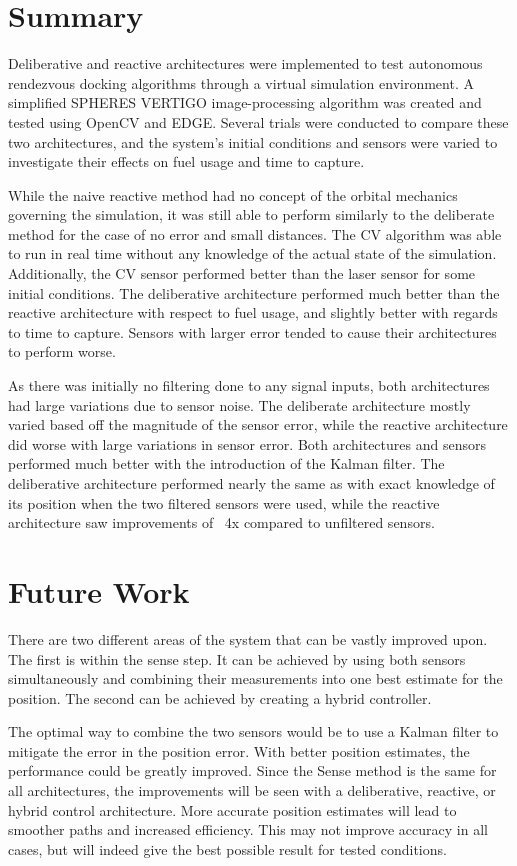 \documentclass[journal, 10pt]{IEEEtran}
\begin{document}
\section{Summary}
Deliberative and reactive architectures were implemented to test autonomous rendezvous docking algorithms through a virtual simulation environment. A simplified SPHERES VERTIGO image-processing algorithm was created and tested using OpenCV and EDGE. Several trials were conducted to compare these two architectures, and the system's initial conditions and sensors were varied to investigate their effects on fuel usage and time to capture.

While the naive reactive method had no concept of the orbital mechanics governing the simulation, it was still able to perform similarly to the deliberate method for the case of no error and small distances. The CV algorithm was able to run in real time without any knowledge of the actual state of the simulation. Additionally, the CV sensor performed better than the laser sensor for some initial conditions. The deliberative architecture performed much better than the reactive architecture with respect to fuel usage, and slightly better with regards to time to capture. Sensors with larger error tended to cause their architectures to perform worse. 

As there was initially no filtering done to any signal inputs, both architectures had large variations due to sensor noise. The deliberate architecture mostly varied based off the magnitude of the sensor error, while the reactive architecture did worse with large variations in sensor error. Both architectures and sensors performed much better with the introduction of the Kalman filter. The deliberative architecture performed nearly the same as with exact knowledge of its position when the two filtered sensors were used, while the reactive architecture saw improvements of ~4x compared to unfiltered sensors.


\section{Future Work}
There are two different areas of the system that can be vastly improved upon.  The first is within the sense step.  It can be achieved by using both sensors simultaneously and combining their measurements into one best estimate for the position.  The second can be achieved by creating a hybrid controller.

The optimal way to combine the two sensors would be to use a Kalman filter to mitigate the error in the position error.  With better position estimates, the performance could be greatly improved.  Since the Sense method is the same for all architectures, the improvements will be seen with a deliberative, reactive, or hybrid control architecture.  More accurate position estimates will lead to smoother paths and increased efficiency. This may not improve accuracy in all cases, but will indeed give the best possible result for tested conditions.
\end{document}
